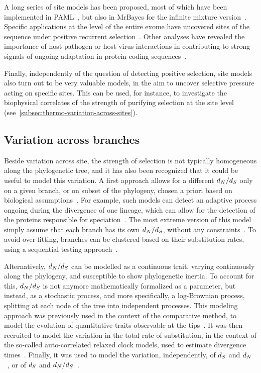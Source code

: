 A long series of site models has been proposed, most of which have been implemented in PAML~\citep{Yang1997a,Yang2007}, but also in MrBayes for the infinite mixture version~\citep{Huelsenbeck2001, Ronquist2012}.
Specific applications at the level of the entire exome have uncovered sites of the sequence under positive recurrent selection~\citep{kosiol_patterns_2008}.
Other analyses have revealed the importance of host-pathogen or host-virus interactions in contributing to strong signals of ongoing adaptation in protein-coding sequences~\citep{Enard2016}.

Finally, independently of the question of detecting positive selection, site models also turn out to be very valuable models, in the aim to uncover selective pressure acting on specific sites.
This can be used, for instance, to investigate the biophysical correlates of the strength of purifying selection at the site level (see~\ref{subsec:thermo-variation-across-sites}).

\subsection{Variation across branches}
\label{subsec:variation-across-branches}

Beside variation across site, the strength of selection is not typically homogeneous along the phylogenetic tree, and it has also been recognized that it could be useful to model this variation.
A first approach allows for a different $d_N / d_S$ only on a given branch, or on subset of the phylogeny, chosen a priori based on biological assumptions~\citep{Yang1998}.
For example, such models can detect an adaptive process ongoing during the divergence of one lineage, which can allow for the detection of the proteins responsible for speciation~\citep{Yang1998, Zhang2004}.
The most extreme version of this model simply assume that each branch has its own $d_N / d_S$, without any constraints~\citep{Popadin2007}.
To avoid over-fitting, branches can be clustered based on their substitution rates, using a sequential testing approach~\citep{Dutheil2012}.

Alternatively, $d_N / d_S$ can be modelled as a continuous trait, varying continuously along the phylogeny, and susceptible to show phylogenetic inertia.
To account for this, $d_N / d_S$ is not anymore mathematically formalized as a parameter, but instead, as a stochastic process, and more specifically, a log-Brownian process, splitting at each node of the tree into independent processes.
This modeling approach was previously used in the context of the comparative method, to model the evolution of quantitative traits observable at the tips~\citep{Felsenstein1985, Huelsenbeck2003}.
It was then recruited to model the variation in the total rate of substitution, in the context of the so-called auto-correlated relaxed clock models, used to estimate divergence times~\citep{Thorne1998}.
Finally, it was used to model the variation, independently, of $d_S$ and $d_N$~\citep{Seo2004}, or of $d_S$ and $d_N / d_S$~\citep{Lartillot2011}.

